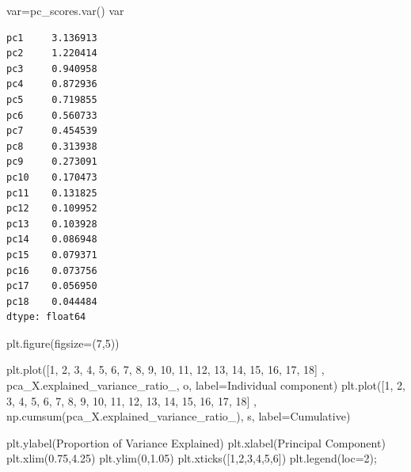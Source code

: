 \documentclass[
  11pt,
  letterpaper,
  DIV=11,
  numbers=noendperiod]{scrartcl}
\newenvironment{Shaded}{\begin{snugshade}}{\end{snugshade}}
\newcommand{\DecValTok}[1]{\textcolor[rgb]{0.68,0.00,0.00}{#1}}
\newcommand{\FloatTok}[1]{\textcolor[rgb]{0.68,0.00,0.00}{#1}}
\newcommand{\NormalTok}[1]{\textcolor[rgb]{0.00,0.23,0.31}{#1}}
\newcommand{\OperatorTok}[1]{\textcolor[rgb]{0.37,0.37,0.37}{#1}}
\newcommand{\StringTok}[1]{\textcolor[rgb]{0.13,0.47,0.30}{#1}}
\begin{document}
\begin{Shaded}
\begin{Highlighting}[]
\NormalTok{var}\OperatorTok{=}\NormalTok{pc\_scores.var()}
\NormalTok{var}
\end{Highlighting}
\end{Shaded}

\begin{verbatim}
pc1     3.136913
pc2     1.220414
pc3     0.940958
pc4     0.872936
pc5     0.719855
pc6     0.560733
pc7     0.454539
pc8     0.313938
pc9     0.273091
pc10    0.170473
pc11    0.131825
pc12    0.109952
pc13    0.103928
pc14    0.086948
pc15    0.079371
pc16    0.073756
pc17    0.056950
pc18    0.044484
dtype: float64
\end{verbatim}

\begin{Shaded}
\begin{Highlighting}[]
\NormalTok{plt.figure(figsize}\OperatorTok{=}\NormalTok{(}\DecValTok{7}\NormalTok{,}\DecValTok{5}\NormalTok{))}

\NormalTok{plt.plot([}\DecValTok{1}\NormalTok{, }\DecValTok{2}\NormalTok{, }\DecValTok{3}\NormalTok{, }\DecValTok{4}\NormalTok{, }\DecValTok{5}\NormalTok{, }\DecValTok{6}\NormalTok{, }\DecValTok{7}\NormalTok{, }\DecValTok{8}\NormalTok{, }\DecValTok{9}\NormalTok{, }\DecValTok{10}\NormalTok{, }\DecValTok{11}\NormalTok{, }\DecValTok{12}\NormalTok{, }\DecValTok{13}\NormalTok{, }\DecValTok{14}\NormalTok{, }\DecValTok{15}\NormalTok{, }\DecValTok{16}\NormalTok{, }\DecValTok{17}\NormalTok{, }\DecValTok{18}\NormalTok{]}
\NormalTok{, pca\_X.explained\_variance\_ratio\_, }\StringTok{\textquotesingle{}{-}o\textquotesingle{}}\NormalTok{, label}\OperatorTok{=}\StringTok{\textquotesingle{}Individual component\textquotesingle{}}\NormalTok{)}
\NormalTok{plt.plot([}\DecValTok{1}\NormalTok{, }\DecValTok{2}\NormalTok{, }\DecValTok{3}\NormalTok{, }\DecValTok{4}\NormalTok{, }\DecValTok{5}\NormalTok{, }\DecValTok{6}\NormalTok{, }\DecValTok{7}\NormalTok{, }\DecValTok{8}\NormalTok{, }\DecValTok{9}\NormalTok{, }\DecValTok{10}\NormalTok{, }\DecValTok{11}\NormalTok{, }\DecValTok{12}\NormalTok{, }\DecValTok{13}\NormalTok{, }\DecValTok{14}\NormalTok{, }\DecValTok{15}\NormalTok{, }\DecValTok{16}\NormalTok{, }\DecValTok{17}\NormalTok{, }\DecValTok{18}\NormalTok{]}
\NormalTok{, np.cumsum(pca\_X.explained\_variance\_ratio\_), }\StringTok{\textquotesingle{}{-}s\textquotesingle{}}\NormalTok{, label}\OperatorTok{=}\StringTok{\textquotesingle{}Cumulative\textquotesingle{}}\NormalTok{)}

\NormalTok{plt.ylabel(}\StringTok{\textquotesingle{}Proportion of Variance Explained\textquotesingle{}}\NormalTok{)}
\NormalTok{plt.xlabel(}\StringTok{\textquotesingle{}Principal Component\textquotesingle{}}\NormalTok{)}
\NormalTok{plt.xlim(}\FloatTok{0.75}\NormalTok{,}\FloatTok{4.25}\NormalTok{)}
\NormalTok{plt.ylim(}\DecValTok{0}\NormalTok{,}\FloatTok{1.05}\NormalTok{)}
\NormalTok{plt.xticks([}\DecValTok{1}\NormalTok{,}\DecValTok{2}\NormalTok{,}\DecValTok{3}\NormalTok{,}\DecValTok{4}\NormalTok{,}\DecValTok{5}\NormalTok{,}\DecValTok{6}\NormalTok{])}
\NormalTok{plt.legend(loc}\OperatorTok{=}\DecValTok{2}\NormalTok{)}\OperatorTok{;}
\end{Highlighting}
\end{Shaded}
\end{document}
